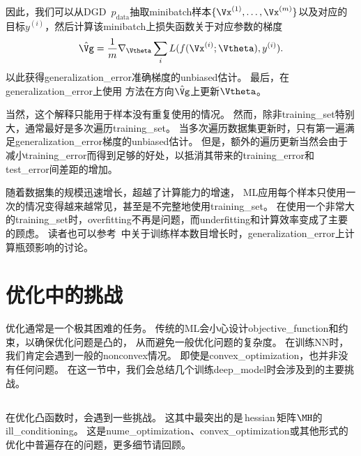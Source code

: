 因此，我们可以从\gls{DGD}~$p_\text{data}$抽取\gls{minibatch}样本$\{ \Vx^{(1)}, \dots,\Vx^{(m)} \}$以及对应的目标$y^{(i)}$，然后计算该\gls{minibatch}上损失函数关于对应参数的梯度
\begin{equation}
\label{eq:8.9}
    \hat{\Vg} = \frac{1}{m} \nabla_{\Vtheta} \sum_i L(f(\Vx^{(i)};\Vtheta),y^{(i)} ).
\end{equation}
以此获得\gls{generalization_error}准确梯度的\gls{unbiased}估计。
最后，在\gls{generalization_error}上使用\,\,方法在方向$\hat{\Vg}$上更新$\Vtheta$。


当然，这个解释只能用于样本没有重复使用的情况。
然而，除非\gls{training_set}特别大，通常最好是多次遍历\gls{training_set}。
当多次遍历数据集更新时，只有第一遍满足\gls{generalization_error}梯度的\gls{unbiased}估计。
但是，额外的遍历更新当然会由于减小\gls{training_error}而得到足够的好处，以抵消其带来的\gls{training_error}和\gls{test_error}间差距的增加。


随着数据集的规模迅速增长，超越了计算能力的增速，
\gls{ML}应用每个样本只使用一次的情况变得越来越常见，甚至是不完整地使用\gls{training_set}。
在使用一个非常大的\gls{training_set}时，\gls{overfitting}不再是问题，而\gls{underfitting}和计算效率变成了主要的顾虑。
读者也可以参考~\cite{Bottou-Bousquet-2008}中关于训练样本数目增长时，\gls{generalization_error}上计算瓶颈影响的讨论。


\section{优化中的挑战}
\label{sec:challenges_in_neural_network_optimization}
优化通常是一个极其困难的任务。
传统的\gls{ML}会小心设计\gls{objective_function}和约束，以确保优化问题是凸的，
从而避免一般优化问题的复杂度。
在训练\gls{NN}时，我们肯定会遇到一般的\gls{nonconvex}情况。
即使是\gls{convex_optimization}，也并非没有任何问题。
在这一节中，我们会总结几个训练\gls{deep_model}时会涉及到的主要挑战。


\subsection{}
\label{sec:ill_conditioning}
在优化凸函数时，会遇到一些挑战。
这其中最突出的是\,\gls{hessian}\,矩阵$\MH$的\gls{ill_conditioning}。
这是\gls{nume_optimization}、\gls{convex_optimization}或其他形式的优化中普遍存在的问题，更多细节请回顾。

